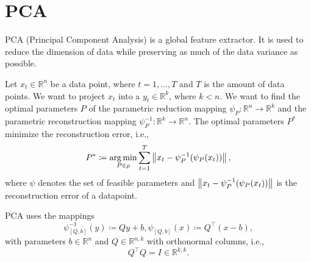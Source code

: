 \section{PCA}
PCA (Principal Component Analysis) is a global feature extractor. It is used to reduce the dimension of data while preserving as much of the data variance as possible.

Let $x_t \in \mathbb{R}^n$ be a data point, where $t=1,\dots,T$ and $T$ is the amount of data points. We want to project $x_t$ into a $y_t \in \mathbb{R}^k$, where $k < n$. We want to find the optimal parameters $P$ of the parametric reduction mapping $\psi_P: \mathbb{R}^n \rightarrow \mathbb{R}^k$ and the parametric reconstruction mapping $\psi_P^{-1}: \mathbb{R}^k \rightarrow \mathbb{R}^n$. The optimal parameters $P^{*}$ minimize the reconstruction error, i.e.,
\begin{equation}
    P^{*} \coloneqq \operatorname*{arg\,min}_{P \in \rho} \sum_{t=1}^T \left\lVert x_t - \psi_P^{-1}(\psi_P(x_t))\right\rVert,
    \label{eq:mapping_optimization}
\end{equation}
where $\psi$ denotes the set of feasible parameters and $\left\lVert x_t - \psi_P^{-1}(\psi_P(x_t))\right\rVert$ is the reconstruction error of a datapoint.

PCA uses the mappings
\begin{equation}
    \psi_{[Q,b]}^{-1}(y) \coloneqq Qy+b, \psi_{[Q,b]}(x) \coloneqq Q^{\top}(x-b),
    \label{eq:pca_mappings}
\end{equation}
with parameters $b \in \mathbb{R}^n$ and $Q \in \mathbb{R}^{n,k}$ with orthonormal columns, i.e.,
\begin{equation}
    Q^{\top}Q = I \in \mathbb{R}^{k,k}.
    \label{eq:pca_identity}
\end{equation}

